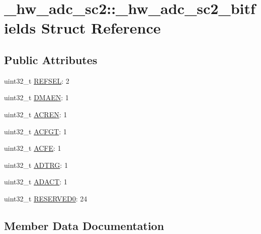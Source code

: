 \hypertarget{struct__hw__adc__sc2_1_1__hw__adc__sc2__bitfields}{}\section{\+\_\+hw\+\_\+adc\+\_\+sc2\+:\+:\+\_\+hw\+\_\+adc\+\_\+sc2\+\_\+bitfields Struct Reference}
\label{struct__hw__adc__sc2_1_1__hw__adc__sc2__bitfields}
\subsection*{Public Attributes}
\begin{DoxyCompactItemize}
\item 
uint32\+\_\+t \hyperlink{struct__hw__adc__sc2_1_1__hw__adc__sc2__bitfields_a3d9281aa34cc80265a57a153d02446fb}{R\+E\+F\+S\+EL}\+: 2
\item 
uint32\+\_\+t \hyperlink{struct__hw__adc__sc2_1_1__hw__adc__sc2__bitfields_a7375be1b61219135dfdb3ca5e5a1e9ac}{D\+M\+A\+EN}\+: 1
\item 
uint32\+\_\+t \hyperlink{struct__hw__adc__sc2_1_1__hw__adc__sc2__bitfields_a538e0345e9881deb07ccefedb061b06e}{A\+C\+R\+EN}\+: 1
\item 
uint32\+\_\+t \hyperlink{struct__hw__adc__sc2_1_1__hw__adc__sc2__bitfields_a4855c44d5aa7c5ac672e45cb666f7b92}{A\+C\+F\+GT}\+: 1
\item 
uint32\+\_\+t \hyperlink{struct__hw__adc__sc2_1_1__hw__adc__sc2__bitfields_a12089dac8dbb16a7c44bdd6c0f4de282}{A\+C\+FE}\+: 1
\item 
uint32\+\_\+t \hyperlink{struct__hw__adc__sc2_1_1__hw__adc__sc2__bitfields_ad8fb509999f4eef0853e961883f70247}{A\+D\+T\+RG}\+: 1
\item 
uint32\+\_\+t \hyperlink{struct__hw__adc__sc2_1_1__hw__adc__sc2__bitfields_accc71697ec693fde2436e2ebedd20128}{A\+D\+A\+CT}\+: 1
\item 
uint32\+\_\+t \hyperlink{struct__hw__adc__sc2_1_1__hw__adc__sc2__bitfields_a6101b8604a8ee115ad068f1eb15af8ce}{R\+E\+S\+E\+R\+V\+E\+D0}\+: 24
\end{DoxyCompactItemize}


\subsection{Member Data Documentation}
